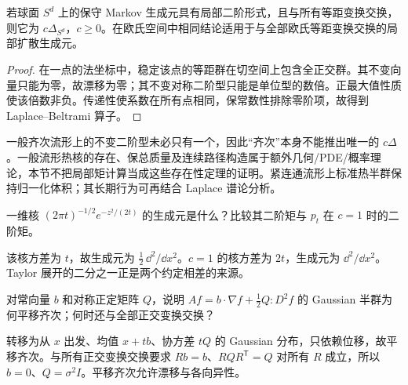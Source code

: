 \begin{proposition}[各向同性下的唯一微分形式]\label{prop:y13-isotropic}
若球面 $S^d$ 上的保守 Markov 生成元具有局部二阶形式，且与所有等距变换交换，则它为 $c\Delta_{S^d}$，$c\ge0$。在欧氏空间中相同结论适用于与全部欧氏等距变换交换的局部扩散生成元。
\end{proposition}
\begin{proof}
在一点的法坐标中，稳定该点的等距群在切空间上包含全正交群。其不变向量只能为零，故漂移为零；其不变对称二阶型只能是单位型的数倍。正最大值性质使该倍数非负。传递性使系数在所有点相同，保常数性排除零阶项，故得到 Laplace--Beltrami 算子。
\end{proof}

一般齐次流形上的不变二阶型未必只有一个，因此“齐次”本身不能推出唯一的 $c\Delta$。一般流形热核的存在、保总质量及连续路径构造属于额外几何/PDE/概率理论，本节不把局部矩计算当成这些存在性定理的证明。紧连通流形上标准热半群保持归一化体积；其长期行为可再结合 Laplace 谱论分析。

\begin{exercise}[生成元的归一化]\label{ex:y13-brownian-scale}
一维核 $(2\pi t)^{-1/2}e^{-z^2/(2t)}$ 的生成元是什么？比较其二阶矩与 $p_t$ 在 $c=1$ 时的二阶矩。
\end{exercise}
\begin{solution}
该核方差为 $t$，故生成元为 $\tfrac12\,\dd^2/\dd x^2$。$c=1$ 的核方差为 $2t$，生成元为 $\dd^2/\dd x^2$。Taylor 展开的二分之一正是两个约定相差的来源。
\end{solution}

\begin{exercise}[平移不等于各向同性]\label{ex:y13-anisotropic}
对常向量 $b$ 和对称正定矩阵 $Q$，说明 $Af=b\cdot\nabla f+\tfrac12 Q:D^2f$ 的 Gaussian 半群为何平移齐次；何时还与全部正交变换交换？
\end{exercise}
\begin{solution}
转移为从 $x$ 出发、均值 $x+tb$、协方差 $tQ$ 的 Gaussian 分布，只依赖位移，故平移齐次。与所有正交变换交换要求 $Rb=b$、$RQR^{\mathsf T}=Q$ 对所有 $R$ 成立，所以 $b=0$、$Q=\sigma^2I$。平移齐次允许漂移与各向异性。
\end{solution}

